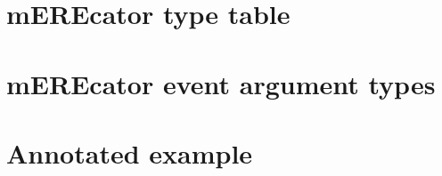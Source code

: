 \newpage

\chapter{mEREcator type table}
\label{app/mEREcator_type_table}


\chapter{mEREcator event argument types}
\label{app/arg_roles}


\chapter{Annotated example}
\label{app/annotated_example}
